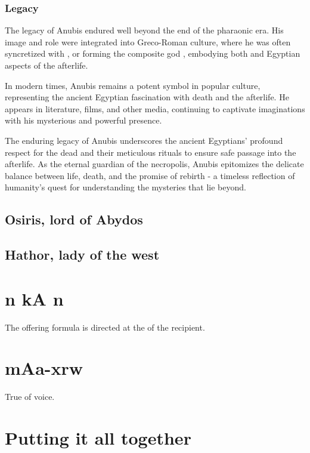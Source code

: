 \subsubsection*{Legacy}
The legacy of Anubis endured well beyond the end of the pharaonic era. His image and role were integrated into Greco-Roman culture, where he was often syncretized with , or forming the composite god , embodying both  and Egyptian aspects of the afterlife.

In modern times, Anubis remains a potent symbol in popular culture, representing the ancient Egyptian fascination with death and the afterlife. He appears in literature, films, and other media, continuing to captivate imaginations with his mysterious and powerful presence.

The enduring legacy of Anubis underscores the ancient Egyptians' profound respect for the dead and their meticulous rituals to ensure safe passage into the afterlife. As the eternal guardian of the necropolis, Anubis epitomizes the delicate balance between life, death, and the promise of rebirth - a timeless reflection of humanity's quest for understanding the mysteries that lie beyond.

\subsection*{Osiris, lord of Abydos}

\subsection*{Hathor, lady of the west}

\section*{n kA n}

The offering formula is directed at the  of the recipient.

\section*{mAa-xrw}

True of voice.

\section*{Putting it all together}